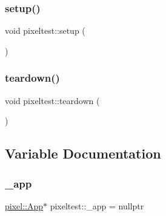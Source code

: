 \subsubsection{\texorpdfstring{setup()}{setup()}}
{\footnotesize\ttfamily void pixeltest\+::setup (\begin{DoxyParamCaption}{ }\end{DoxyParamCaption})}

\mbox{\label{namespacepixeltest_ace98b9eea3017f56f7a554bf3eb5149f}} 
\subsubsection{\texorpdfstring{teardown()}{teardown()}}
{\footnotesize\ttfamily void pixeltest\+::teardown (\begin{DoxyParamCaption}{ }\end{DoxyParamCaption})}



\subsection{Variable Documentation}
\mbox{\label{namespacepixeltest_a32fe0d2ad3f2c649b959003419ef989a}} 
\subsubsection{\texorpdfstring{\+\_\+app}{\_app}}
{\footnotesize\ttfamily \hyperlink{classpixel_1_1_app}{pixel\+::\+App}$\ast$ pixeltest\+::\+\_\+app = nullptr\hspace{0.3cm}{\ttfamily [static]}}

